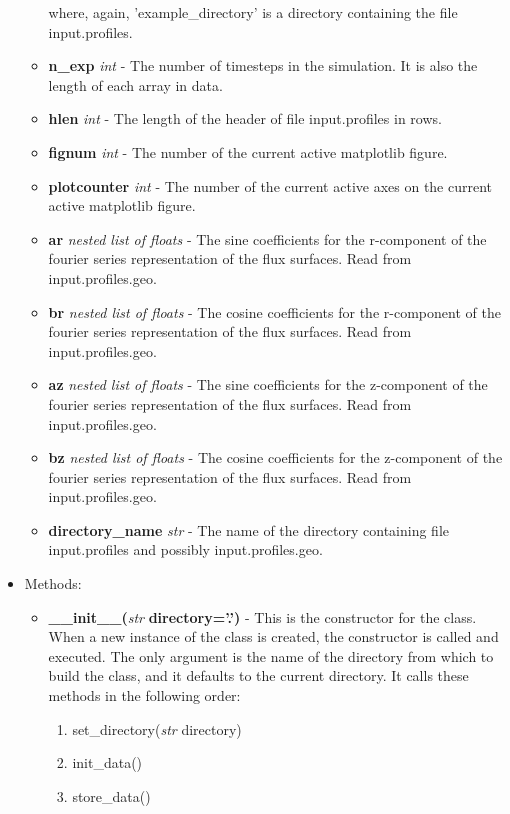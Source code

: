 \documentclass{article}
\begin{document}
\begin{itemize}
\begin{itemize}
\fontfamily{\rmdefault}\selectfont
\noindent where, again, 'example\_directory' is a directory containing the file input.profiles.
\item \textbf{n\_exp} \emph{int} - The number of timesteps in the simulation.  It is also the length of each array in data.
\item \textbf{hlen} \emph{int} - The length of the header of file input.profiles in rows.
\item \textbf{fignum} \emph{int} - The number of the current active matplotlib figure.
\item \textbf{plotcounter} \emph{int} - The number of the current active axes on the current active matplotlib figure.
\item \textbf{ar} \emph{nested list of floats} - The sine coefficients for the r-component of the fourier series representation of the flux surfaces.  Read from input.profiles.geo.
\item \textbf{br} \emph{nested list of floats} - The cosine coefficients for the r-component of the fourier series representation of the flux surfaces.  Read from input.profiles.geo.
\item \textbf{az} \emph{nested list of floats} - The sine coefficients for the z-component of the fourier series representation of the flux surfaces.  Read from input.profiles.geo.
\item \textbf{bz} \emph{nested list of floats} - The cosine coefficients for the z-component of the fourier series representation of the flux surfaces.  Read from input.profiles.geo.
\item \textbf{directory\_name} \emph{str} - The name of the directory containing file input.profiles and possibly input.profiles.geo.
\end{itemize}
\item Methods:
\begin{itemize}
\item \textbf{\_\_init\_\_(}\emph{str}\textbf{ directory='.')} - This is the constructor for the class.  When a new instance of the class is created, the constructor is called and executed.  The only argument is the name of the directory from which to build the class, and it defaults to the current directory.  It calls these methods in the following order:
\begin{enumerate}
\item set\_directory(\emph{str} directory)
\item init\_data()
\item store\_data()
\end{enumerate}

\end{itemize}
\end{itemize}
\end{document}
